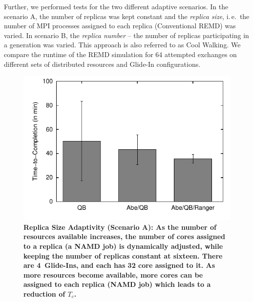 \documentclass{rspublic}
\begin{document}
Further, we performed tests for the two different adaptive scenarios.
In the scenario A, the number of replicas was kept constant and the
\emph{replica size}, i.\,e.\ the number of MPI processes assigned to
each replica (Conventional REMD) was varied.  In scenario B, the
\emph{replica number} -- the number of replicas participating in a
generation was varied. This approach is also referred to as Cool
Walking.  We compare the runtime of the REMD simulation for 64
attempted exchanges on different sets of distributed resources and
Glide-In configurations.
                    
\begin{figure}[h]
  \begin{minipage}[t]{.48\textwidth}
    \begin{center}  
      \includegraphics[width=\textwidth]{performance/perf_distributed_size_replica.pdf}
      \caption{\footnotesize \bf Replica Size Adaptivity (Scenario A):
        As the number of resources available increases, the number of
        cores assigned to a replica (a NAMD job) is dynamically
        adjusted, while keeping the number of replicas constant at
        sixteen.  There are 4~Glide-Ins, and each has 32 core assigned
        to it.  As more resources become available, more cores can be
        assigned to each replica (NAMD job) which leads to a reduction
        of $T_{c}$.  }
      \label{fig:performance_perf_distributed_A}
    \end{center}
  \end{minipage}
  \hfill
  \begin{minipage}[t]{.485\textwidth}
    \begin{center}  
     

\end{center}
\end{minipage}
\end{figure}
\end{document}
